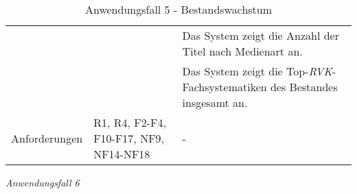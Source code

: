 \begin{table}[h]
\begin{adjustbox}{max width=\textwidth}
\begin{tabular}{lp{7.0cm}p{7.0cm}}
                                        & &Das System zeigt die Anzahl der Titel nach Medienart an.\\
                                         & &Das System zeigt die Top-\textit{\acrshort{RVK}}-Fachsystematiken des Bestandes insgesamt an.\\

        Anforderungen                   &R1, R4, F2-F4, F10-F17, NF9, NF14-NF18& -\\
        \bottomrule
    \end{tabular}
    \end{adjustbox}
    \caption{%
    Anwendungsfall 5 - Bestandswachstum   }
    \label{tab:AF_Bestandswachstum}
    \end{table}
\endgroup


\clearpage
\noindent
\textit{Anwendungsfall 6}

